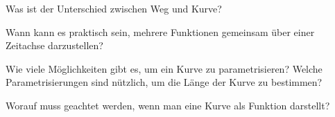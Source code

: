 \begin{Abschluss}
\item Was ist der Unterschied zwischen Weg und Kurve?
\item Wann kann es praktisch sein, mehrere Funktionen gemeinsam über einer Zeitachse darzustellen?
\item Wie viele Möglichkeiten gibt es, um ein Kurve zu parametrisieren? Welche Parametrisierungen sind nützlich, um die Länge der Kurve zu bestimmen?
\item Worauf muss geachtet werden, wenn man eine Kurve als Funktion darstellt?
\end{Abschluss}

